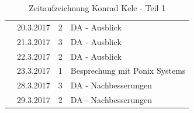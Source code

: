 \documentclass[12pt]{article}
\begin{document}
\begin{table}[hp]
\begin{tabular}{|l|r|c|l|}
                                                                                                      & 20.3.2017                           & 2                                         & DA - Ausblick                                                                              \\ \cline{2-4} 
                                                                                                      & 21.3.2017                           & 3                                         & DA - Ausblick                                                                              \\ \cline{2-4} 
                                                                                                      & 22.3.2017                           & 2                                         & DA - Ausblick                                                                              \\ \cline{2-4} 
                                                                                                      & 23.3.2017                           & 1                                         & Besprechung mit Ponix Systems                                                              \\ \cline{2-4} 
                                                                                                      & 28.3.2017                           & 3                                         & DA - Nachbesserungen                                                                       \\ \cline{2-4} 
                                                                                                      & 29.3.2017                           & 2                                         & DA - Nachbesserungen                                                                       \\ \hline
\end{tabular}
\caption{Zeitaufzeichnung Konrad Kelc - Teil 1}
\end{table}

\clearpage
\end{document}
